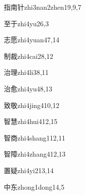\begin{verbete}{指南针}{zhi3nan2zhen1}{9,9,7}
\end{verbete}

\begin{verbete}{至于}{zhi4yu2}{6,3}
\end{verbete}

\begin{verbete}{志愿}{zhi4yuan4}{7,14}
\end{verbete}

\begin{verbete}{制裁}{zhi4cai2}{8,12}
\end{verbete}

\begin{verbete}{治理}{zhi4li3}{8,11}
\end{verbete}

\begin{verbete}{治愈}{zhi4yu4}{8,13}
\end{verbete}

\begin{verbete}{致敬}{zhi4jing4}{10,12}
\end{verbete}

\begin{verbete}{智慧}{zhi4hui4}{12,15}
\end{verbete}

\begin{verbete}{智商}{zhi4shang1}{12,11}
\end{verbete}

\begin{verbete}{智障}{zhi4zhang4}{12,13}
\end{verbete}

\begin{verbete}{置疑}{zhi4yi2}{13,14}
\end{verbete}

\begin{verbete}{中东}{zhong1dong1}{4,5}
\end{verbete}

